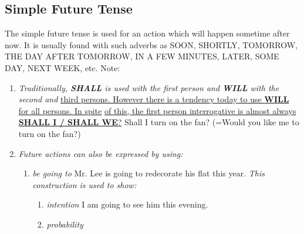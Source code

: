 \subsection{Simple Future Tense}
The simple future tense is used for an action which will happen sometime after
now. It is usually found with such adverbs as SOON, SHORTLY, TOMORROW, THE DAY
AFTER TOMORROW, IN A FEW MINUTES, LATER, SOME DAY, NEXT WEEK, etc.
\newline
\newline
Note:
\begin{enumerate}
    \item {\it Traditionally, {\bf SHALL} is used with the first person
        and {\bf WILL} with the second and}
        \newline
        \underline{third persons. However there is a tendency today to use
        {\bf WILL} for all persons. In spite}
        \newline
        \underline{of this, the first person
        interrogative is almost always {\bf SHALL I / SHALL WE}?}
        \newline
        \newline
        Shall I turn on the fan? (=Would you like me to turn on the fan?)
    \item {\it Future actions can also be expressed by using:}
        \newline
        \newline
        \begin{enumerate}
            \item {\it be going to}
                \newline
                \newline
                Mr. Lee is going to redecorate his flat this year.
                \newline
                \newline
                {\it This construction is used to show:}
                \begin{enumerate}
                    \item {\it intention}
                        \newline
                        \newline
                        I am going to see him this evening.
                    \item {\it probability}
                        \newline
                        \newline

\end{enumerate}
\end{enumerate}
\end{enumerate}
